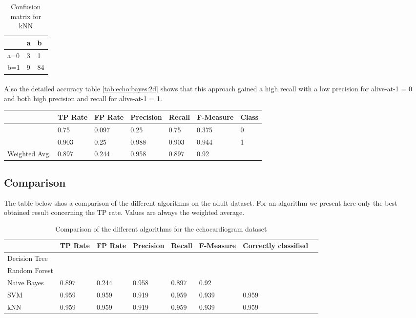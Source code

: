 \documentclass[paper=a4, fontsize=11pt]{scrartcl} %
\numberwithin{equation}{section} %
\numberwithin{figure}{section} %
\numberwithin{table}{section} %
\begin{document}
\begin{table}[h]
\centering
\begin{tabular}{|l|ll|}
\hline
 & a &	b \\
\hline
a=0 & 3 & 1 \\
b=1 & 9 & 84\\
\hline
\end{tabular}
\caption{Confusion matrix for kNN}
\label{tab:echo:bayes:2c}
\end{table}

\paragraph{}Also the detailed accuracy table \ref{tab:echo:bayes:2d} shows that this approach gained a high recall with a low precision for alive-at-1 = 0 and both high precision and recall for alive-at-1 = 1.

\begin{table*}[htb]\centering
  \begin{tabular*}{\columnwidth}{@{}lllllll@{}}
      \toprule 
              &  TP Rate & FP Rate & Precision & Recall & F-Measure & Class    \\  \midrule
              &   0.75   & 0.097   & 0.25      & 0.75   & 0.375     & 0 \\
              &   0.903  & 0.25    & 0.988     & 0.903  & 0.944     & 1 \\
Weighted Avg. &   0.897  & 0.244   & 0.958     & 0.897  & 0.92      &   \\ \bottomrule
  \end{tabular*}
\caption{Naive Bayes with SMOTE filter} 
\label{tab:echo:bayes:2d}
\end{table*}


\subsection{Comparison}

The table below shos a comparison of the different algorithms on the adult dataset. For an algorithm we present here only the best obtained result concerning the TP rate. Values are always the weighted average.

\begin{table}[h]
\centering
\begin{tabular}{llllllll}
	\toprule
									&TP Rate   	&FP Rate   &Precision &Recall  &F-Measure   &  Correctly classified\\
	\midrule
	Decision Tree		\\
  Random Forest		\\
  Naive Bayes			&0.897  		& 0.244   	& 0.958   & 0.897  &0.92      	& \\
  SVM							&0.959     	&0.959     	&0.919   	&0.959   &0.939     	&	0.959\\
  kNN							&0.959     	&0.959     	&0.919   	&0.959   &0.939     	&	0.959\\
	\bottomrule
\end{tabular}
\caption{Comparison of the different algorithms for the echocardiogram dataset}
\end{table}
\end{document}
